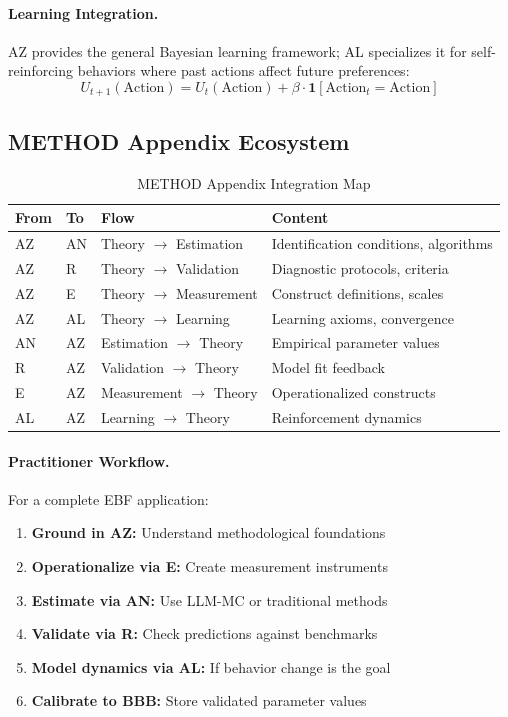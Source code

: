 \paragraph{Learning Integration.}
AZ provides the general Bayesian learning framework; AL specializes it for
self-reinforcing behaviors where past actions affect future preferences:
\begin{equation}
U_{t+1}(\text{Action}) = U_t(\text{Action}) + \beta \cdot \mathbf{1}[\text{Action}_t = \text{Action}]
\end{equation}

\subsection{METHOD Appendix Ecosystem}

\begin{table}[htbp]
\centering
\caption{METHOD Appendix Integration Map}
\label{tab:az-method-ecosystem}
\renewcommand{\arraystretch}{1.3}
\begin{tabular}{@{}lllp{4cm}@{}}
\toprule
\textbf{From} & \textbf{To} & \textbf{Flow} & \textbf{Content} \\
\midrule
AZ & AN & Theory $\to$ Estimation & Identification conditions, algorithms \\
AZ & R & Theory $\to$ Validation & Diagnostic protocols, criteria \\
AZ & E & Theory $\to$ Measurement & Construct definitions, scales \\
AZ & AL & Theory $\to$ Learning & Learning axioms, convergence \\
\addlinespace
AN & AZ & Estimation $\to$ Theory & Empirical parameter values \\
R & AZ & Validation $\to$ Theory & Model fit feedback \\
E & AZ & Measurement $\to$ Theory & Operationalized constructs \\
AL & AZ & Learning $\to$ Theory & Reinforcement dynamics \\
\bottomrule
\end{tabular}
\end{table}

\paragraph{Practitioner Workflow.}
For a complete EBF application:
\begin{enumerate}
\item \textbf{Ground in AZ:} Understand methodological foundations
\item \textbf{Operationalize via E:} Create measurement instruments
\item \textbf{Estimate via AN:} Use LLM-MC or traditional methods
\item \textbf{Validate via R:} Check predictions against benchmarks
\item \textbf{Model dynamics via AL:} If behavior change is the goal
\item \textbf{Calibrate to BBB:} Store validated parameter values
\end{enumerate}


